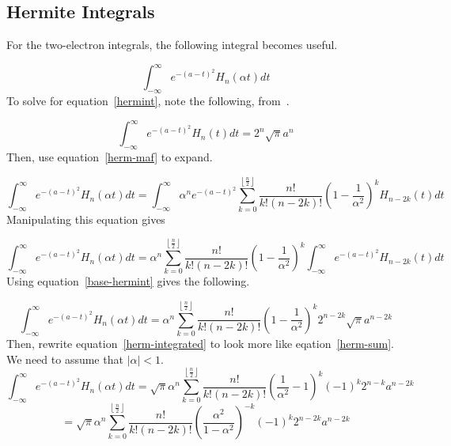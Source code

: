 \documentclass[twoside,10pt,draft]{article}
\begin{document}
\subsection{Hermite Integrals}

For the two-electron integrals, the following integral becomes useful.

\begin{equation}
  \int_{-\infty}^\infty e^{-\left(a - t\right)^2} H_{n}\left(\alpha t\right) dt
  \label{hermint}
\end{equation}
To solve for equation~\ref{hermint}, note the following, from~\cite{wolfram-hermite}.

\begin{equation}
  \int_{-\infty}^\infty e^{-\left(a - t\right)^2} H_{n}\left(t\right) dt = 2^n \sqrt{\pi} a^n
  \label{base-hermint}
\end{equation}
Then, use equation~\ref{herm-maf} to expand.

\begin{equation}
  \int_{-\infty}^\infty e^{-(a - t)^2} H_n(\alpha t) dt = \int_{-\infty}^\infty \alpha^n e^{-(a - t)^2} \sum_{k = 0}^{\left\lfloor\frac{n}{2}\right\rfloor} \frac{n!}{k!(n - 2k)!}\left(1 - \frac{1}{\alpha^2}\right)^k H_{n - 2k}(t) dt
\end{equation}
Manipulating this equation gives

\begin{equation}
  \int_{-\infty}^\infty e^{-(a - t)^2} H_n(\alpha t) dt = \alpha^n \sum_{k = 0}^{\left\lfloor\frac{n}{2}\right\rfloor} \frac{n!}{k!(n - 2k)!}\left(1 - \frac{1}{\alpha^2}\right)^k \int_{-\infty}^\infty e^{-(a - t)^2} H_{n - 2k}(t) dt
\end{equation}
Using equation~\ref{base-hermint} gives the following.

\begin{equation}
  \int_{-\infty}^\infty e^{-(a - t)^2} H_n(\alpha t) dt = \alpha^n \sum_{k = 0}^{\left\lfloor\frac{n}{2}\right\rfloor} \frac{n!}{k!(n - 2k)!}\left(1 - \frac{1}{\alpha^2}\right)^k 2^{n - 2k} \sqrt{\pi} a^{n - 2k}
  \label{herm-integrated}
\end{equation}
Then, rewrite equation~\ref{herm-integrated} to look more like eqation~\ref{herm-sum}. We need to assume that $\left|\alpha \right| < 1$.
\begin{equation}
  \int_{-\infty}^\infty e^{-(a - t)^2} H_n(\alpha t) dt = \sqrt{\pi} \alpha^n \sum_{k = 0}^{\left\lfloor\frac{n}{2}\right\rfloor} \frac{n!}{k!(n - 2k)!} \left(\frac{1}{\alpha^2} - 1\right)^k (-1)^k 2^{n - k} a^{n - 2k}
\end{equation}
\begin{equation}
  = \sqrt{\pi} \alpha^n \sum_{k = 0}^{\left\lfloor\frac{n}{2}\right\rfloor} \frac{n!}{k!(n - 2k)!} \left(\frac{\alpha^2}{1 - \alpha^2}\right)^{-k} (-1)^k 2^{n - 2k} a^{n - 2k}
\end{equation}
\end{document}
